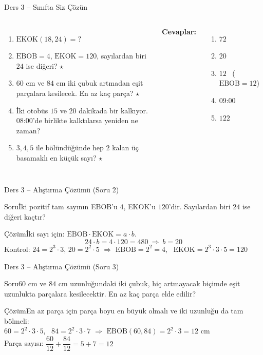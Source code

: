 \documentclass[aspectratio=169,11pt]{beamer}
\newcommand{\soru}[3]{%
\begin{frame}{#1}
  \begin{block}{Soru}\large #2\end{block}
  \pause
  \begin{exampleblock}{Çözüm}\large #3\end{exampleblock}
\end{frame}}
\begin{document}
\begin{frame}{Ders 3 -- Sınıfta Siz Çözün}
\begin{columns}[t]
\begin{enumerate}
\item \(\text{EKOK}(18,24)=?\)
\item \(\text{EBOB}=4\), \(\text{EKOK}=120\), sayılardan biri \(24\) ise diğeri? \(\star\)
\item \(60\) cm ve \(84\) cm iki çubuk artmadan eşit parçalara kesilecek. En az kaç parça? \(\star\)
\item İki otobüs \(15\) ve \(20\) dakikada bir kalkıyor. 08{:}00'de birlikte kalktılarsa yeniden ne zaman?
\item \(3,4,5\) ile bölündüğünde hep \(2\) kalan üç basamaklı en küçük sayı? \(\star\)
\end{enumerate}
\pause
\textbf{Cevaplar:}
\begin{enumerate}
\item \(72\)
\item \(20\)
\item \(12\) \ (\(\text{EBOB}=12\))
\item 09{:}00
\item \(122\)
\end{enumerate}
\end{columns}
\vspace{4pt}{\footnotesize \(\star\) işaretli soruların adım adım çözümü sonraki slaytlardadır.}
\end{frame}

\soru{Ders 3 -- Alıştırma Çözümü (Soru 2)}
{İki pozitif tam sayının EBOB'u \(4\), EKOK'u \(120\)'dir. Sayılardan biri \(24\) ise diğeri kaçtır?}
{İki sayı için: \(\text{EBOB}\cdot\text{EKOK}=a\cdot b\).
\[24\cdot b=4\cdot 120=480\ \Rightarrow\ b=20\]
Kontrol: \(24=2^3\cdot 3\), \(20=2^2\cdot 5\) \(\Rightarrow\) \(\text{EBOB}=2^2=4\), \ \(\text{EKOK}=2^3\cdot 3\cdot 5=120\) \checkmark}

\soru{Ders 3 -- Alıştırma Çözümü (Soru 3)}
{\(60\) cm ve \(84\) cm uzunluğundaki iki çubuk, hiç artmayacak biçimde eşit uzunlukta parçalara kesilecektir. En az kaç parça elde edilir?}
{En az parça için parça boyu en büyük olmalı ve iki uzunluğu da tam bölmeli:\\[3pt]
\(60=2^2\cdot 3\cdot 5\), \ \(84=2^2\cdot 3\cdot 7\) \(\Rightarrow\) \(\text{EBOB}(60,84)=2^2\cdot 3=12\) cm\\[3pt]
Parça sayısı: \(\dfrac{60}{12}+\dfrac{84}{12}=5+7=12\)}
\end{document}
